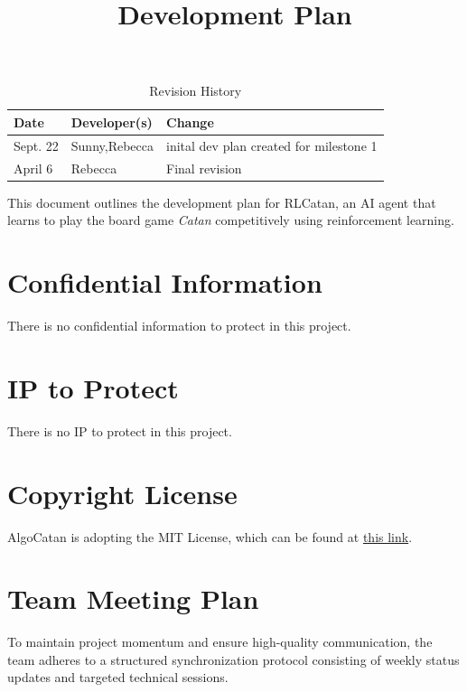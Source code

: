 \documentclass{article}
\title{Development Plan\\\progname}
\author{\authname}
\date{}
\begin{document}
\maketitle

\begin{table}[hp]
\caption{Revision History} \label{TblRevisionHistory}
\begin{tabularx}{\textwidth}{llX}
\toprule
\textbf{Date} & \textbf{Developer(s)} & \textbf{Change}\\
\midrule
Sept. 22 & Sunny,Rebecca & inital dev plan created for milestone 1\\
April 6 & Rebecca & Final revision\\
\bottomrule
\end{tabularx}
\end{table}

\newpage{}

\raggedright
This document outlines the development plan for RLCatan, an
AI agent that learns to play the board game \emph{Catan} competitively 
using reinforcement learning. 

\section{Confidential Information}

\raggedright
There is no confidential information to protect in this project.

\section{IP to Protect}

\raggedright
There is no IP to protect in this project.

\section{Copyright License}

\raggedright{AlgoCatan is adopting the MIT License, which can be found at \href{https://github.com/AlgoCatan/RLCatan/blob/main/LICENSE}{this link}.}



\section{Team Meeting Plan}

To maintain project momentum and ensure high-quality communication, the team adheres to a structured synchronization protocol consisting of weekly status updates and targeted technical sessions.
\end{document}
